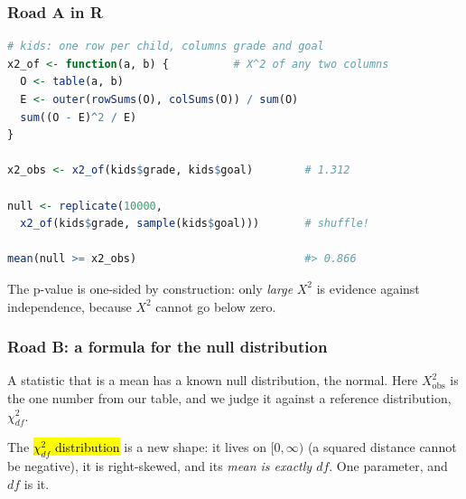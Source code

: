 \documentclass[slidestop,compress,mathserif]{beamer}
\begin{document}
\begin{frame}[fragile]
\frametitle{Road A in R}

\begin{lstlisting}[language=R, basicstyle=\ttfamily\scriptsize]
# kids: one row per child, columns grade and goal
x2_of <- function(a, b) {          # X^2 of any two columns
  O <- table(a, b)
  E <- outer(rowSums(O), colSums(O)) / sum(O)
  sum((O - E)^2 / E)
}

x2_obs <- x2_of(kids$grade, kids$goal)        # 1.312

null <- replicate(10000,
  x2_of(kids$grade, sample(kids$goal)))       # shuffle!

mean(null >= x2_obs)                          #> 0.866
\end{lstlisting}

\vspace{-0.3em}
{\small The p-value is one-sided by construction: only \emph{large} $X^2$ is evidence against independence, because $X^2$ cannot go below zero.}

\end{frame}

\begin{frame}
\frametitle{Road B: a formula for the null distribution}

A statistic that is a mean has a known null distribution, the normal. Here $X^2_{\mathrm{obs}}$ is the one number from our table, and we judge it against a reference distribution, $\chi^2_{df}$.

\vspace{0.2em}

\vspace{0.1em}
{\small The \hl{$\chi^2_{df}$ distribution} is a new shape: it lives on $[0,\infty)$ (a squared distance cannot be negative), it is right-skewed, and its \emph{mean is exactly $df$}. One parameter, and $df$ is it.}

\end{frame}
\end{document}
